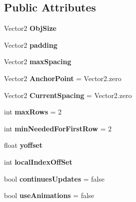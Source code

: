 \subsection*{Public Attributes}
\begin{DoxyCompactItemize}
\item 
Vector2 {\bfseries Obj\+Size}\hypertarget{class_custom_grid_a0cf591b7ae82c985d1983171d9391712}{}\label{class_custom_grid_a0cf591b7ae82c985d1983171d9391712}

\item 
Vector2 {\bfseries padding}\hypertarget{class_custom_grid_aa1f53f156756dfe4d9d2795fe2c52754}{}\label{class_custom_grid_aa1f53f156756dfe4d9d2795fe2c52754}

\item 
Vector2 {\bfseries max\+Spacing}\hypertarget{class_custom_grid_a068ef9a666cd31142751320e2a653025}{}\label{class_custom_grid_a068ef9a666cd31142751320e2a653025}

\item 
Vector2 {\bfseries Anchor\+Point} = Vector2.\+zero\hypertarget{class_custom_grid_af7596d0b65aa5ea01ae27898c523b1b5}{}\label{class_custom_grid_af7596d0b65aa5ea01ae27898c523b1b5}

\item 
Vector2 {\bfseries Current\+Spacing} = Vector2.\+zero\hypertarget{class_custom_grid_ab9594c84442d7bd9f8cad31cd2d75c84}{}\label{class_custom_grid_ab9594c84442d7bd9f8cad31cd2d75c84}

\item 
int {\bfseries max\+Rows} = 2\hypertarget{class_custom_grid_a74432277987a0e6cc02d0db891ec77ba}{}\label{class_custom_grid_a74432277987a0e6cc02d0db891ec77ba}

\item 
int {\bfseries min\+Needed\+For\+First\+Row} = 2\hypertarget{class_custom_grid_a985fc1fc02418d3286ffbd41c98417a5}{}\label{class_custom_grid_a985fc1fc02418d3286ffbd41c98417a5}

\item 
float {\bfseries yoffset}\hypertarget{class_custom_grid_aa07b1f547bdbef9d050b5f57d96f744a}{}\label{class_custom_grid_aa07b1f547bdbef9d050b5f57d96f744a}

\item 
int {\bfseries local\+Index\+Off\+Set}\hypertarget{class_custom_grid_a3f5ed027b4c6fab8a01de11b7b780876}{}\label{class_custom_grid_a3f5ed027b4c6fab8a01de11b7b780876}

\item 
bool {\bfseries continues\+Updates} = false\hypertarget{class_custom_grid_a9bddd45525d796a4db2edcbe8f669773}{}\label{class_custom_grid_a9bddd45525d796a4db2edcbe8f669773}

\item 
bool {\bfseries use\+Animations} = false\hypertarget{class_custom_grid_ae7281905d1114c2582f02d0d1badf53f}{}\label{class_custom_grid_ae7281905d1114c2582f02d0d1badf53f}

\end{DoxyCompactItemize}


